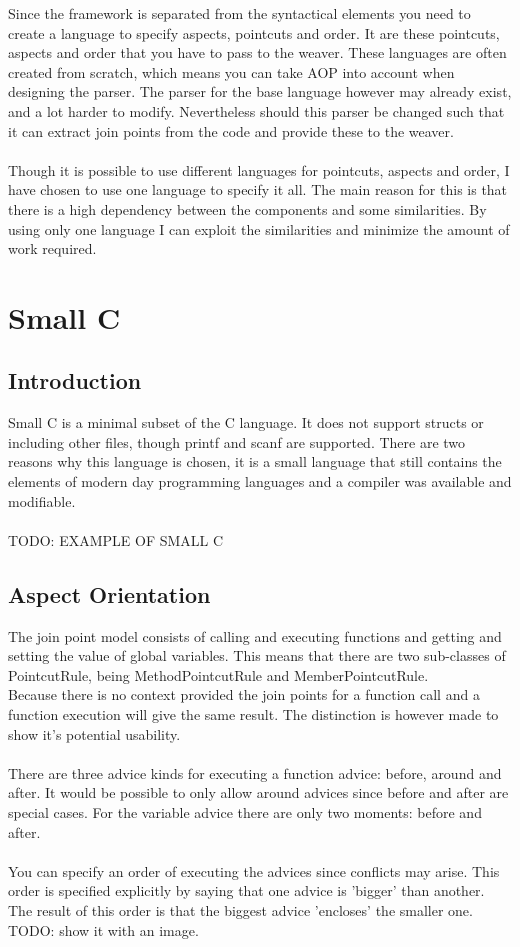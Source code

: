 \documentclass[a4paper]{report}
\begin{document}
Since the framework is separated from the syntactical elements you need to create a language to specify aspects, pointcuts and order. It are these pointcuts, aspects and order that you have to pass to the weaver. These languages are often created from scratch, which means you can take AOP into account when designing the parser. The parser for the base language however may already exist, and a lot harder to modify. Nevertheless should this parser be changed such that it can extract join points from the code and provide these to the weaver.\\
\\
Though it is possible to use different languages for pointcuts, aspects and order, I have chosen to use one language to specify it all. The main reason for this is that there is a high dependency between the components and some similarities. By using only one language I can exploit the similarities and minimize the amount of work required.

\chapter{Small C}
\section{Introduction}
Small C is a minimal subset of the C language. It does not support structs or including other files, though printf and scanf are supported. There are two reasons why this language is chosen, it is a small language that still contains the elements of modern day programming languages and a compiler was available and modifiable.\\
\\
TODO: EXAMPLE OF SMALL C

\section{Aspect Orientation}
The join point model consists of calling and executing functions and getting and setting the value of global variables. This means that there are two sub-classes of PointcutRule, being MethodPointcutRule and MemberPointcutRule.\\
Because there is no context provided the join points for a function call and a function execution will give the same result. The distinction is however made to show it's potential usability.\\
\\
There are three advice kinds for executing a function advice: before, around and after. It would be possible to only allow around advices since before and after are special cases. For the variable advice there are only two moments: before and after.\\
\\
You can specify an order of executing the advices since conflicts may arise. This order is specified explicitly by saying that one advice is 'bigger' than another. The result of this order is that the biggest advice 'encloses' the smaller one.\\
TODO: show it with an image.
\end{document}
